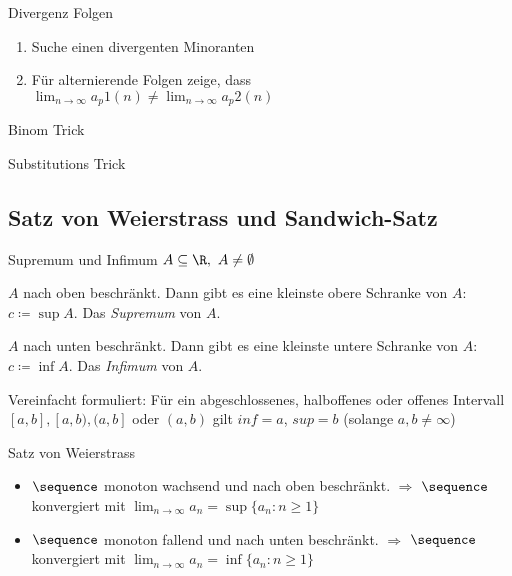 \begin{KR}{Divergenz Folgen}
    \begin{enumerate}
        \item  Suche einen divergenten Minoranten
        \item Für alternierende Folgen zeige, dass \\$\lim_{n \to \infty} a_p1(n) \neq \lim_{n \to \infty} a_p2(n)$
    \end{enumerate}
\end{KR}

\begin{KR}{Binom Trick}\\
\end{KR}

\begin{KR}{Substitutions Trick}\\
\end{KR}

\subsection{Satz von Weierstrass und Sandwich-Satz}

\begin{definition}{Supremum und Infimum}
    $A \subseteq \R, ~A\neq \emptyset$
    \begin{enumerateroman}
        \item $A$ nach oben beschränkt. Dann gibt es eine kleinste obere Schranke von $A$: $c \coloneqq \sup A$. Das \emph{Supremum} von $A$.
        \item $A$ nach unten beschränkt. Dann gibt es eine kleinste untere Schranke von $A$: $c \coloneqq \inf A$. Das \emph{Infimum} von $A$.
    \end{enumerateroman}
    \tcblower
    Vereinfacht formuliert: Für ein abgeschlossenes, halboffenes oder offenes Intervall $[a,b], [a,b), (a,b]$ oder $(a,b)$ gilt $inf = a$, $sup = b$ (solange $a, b \neq \infty$)
\end{definition}

\begin{concept}{Satz von Weierstrass}
    \begin{itemize}
        \item $\sequence$ monoton wachsend und nach oben beschränkt. $\Rightarrow$ $\sequence$ konvergiert mit $\lim_{n \to \infty} a_n = \sup \{a_n : n \geq 1\}$
        \item $\sequence$ monoton fallend und nach unten beschränkt. $\Rightarrow$ $\sequence$ konvergiert mit $\lim_{n \to \infty} a_n = \inf \{a_n : n \geq 1\}$
    \end{itemize}
\end{concept}

